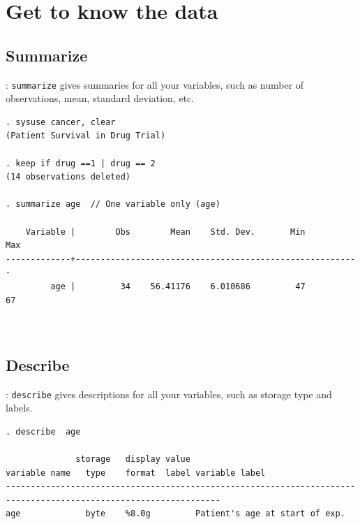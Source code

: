 
\section{Get to know the data}
\subsection{Summarize}
\begin{frame}[fragile]{\secname : \subsecname}
\verb|summarize| gives summaries for all your variables, such as number of observations, mean, standard deviation, etc. \\[4mm]
\small
\begin{verbatim}
. sysuse cancer, clear
(Patient Survival in Drug Trial)

. keep if drug ==1 | drug == 2
(14 observations deleted)

. summarize age  // One variable only (age)

    Variable |        Obs        Mean    Std. Dev.       Min        Max
-------------+---------------------------------------------------------
         age |         34    56.41176    6.010686         47         67

	
\end{verbatim}

\end{frame}


\subsection{Describe}
\begin{frame}[fragile]{\secname : \subsecname}
\verb|describe| gives descriptions for all your variables, such as storage type and labels. \\[4mm]
\small
\begin{verbatim}
. describe  age 

              storage   display value
variable name   type    format  label variable label
-----------------------------------------------------------------------------------------------------------------
age             byte    %8.0g         Patient's age at start of exp.


\end{verbatim}

\end{frame}

